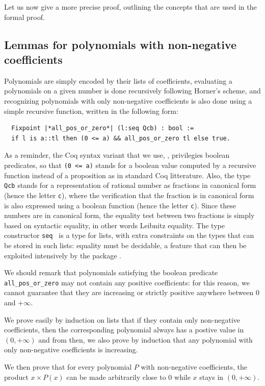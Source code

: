\documentclass{mscs}
\begin{document}
Let us now give a more precise proof, outlining the concepts that are
used in the formal proof.

\subsection{Lemmas for polynomials with non-negative coefficients}
Polynomials are simply encoded by their lists of coefficients, evaluating
a polynomials on a given number is done recursively following Horner's scheme,
and recognizing polynomials with only non-negative coefficients is also
done using a simple recursive function, written in the following form:
\begin{lstlisting}
  Fixpoint |*all_pos_or_zero*| (l:seq Qcb) : bool :=
  if l is a::tl then (0 <= a) && all_pos_or_zero tl else true.
\end{lstlisting}
As a reminder, the Coq syntax variant that we use, \ssr{},
privilegies boolean predicates, so that {\tt (0 <= a)} stands for a boolean
value computed by a recursive function instead of a proposition as in
standard Coq litterature.  Also, the type {\tt Qcb} stands for a
representation of
rational number as fractions in canonical form (hence the letter {\tt c}), where
the verification that the fraction is in canonical form is also expressed
using a boolean function (hence the letter {\tt c}).  Since these numbers
are in canonical form, the equality test between two fractions is simply based
on syntactic equality, in other words Leibnitz equality.  The type constructor
{\tt seq } is a type for lists, with extra constraints on the types
that can be
stored in such lists: equality must be decidable, a feature that can then be
exploited intensively by the \ssr{} package
\cite{GONTHIER:2008:INRIA-00258384:4}.

We should remark that polynomials satisfying the boolean predicate
{\tt all\_pos\_or\_zero} may not contain any positive coefficients: for this
reason, we cannot guarantee that they are increasing or strictly positive
anywhere between 0 and \(+\infty\).

We prove easily by induction on lists that if they contain only non-negative
coefficients, then the corresponding polynomial always has a postive value
in \((0,+\infty)\) and from then, we also prove by induction that
any polynomial with only non-negative coefficients is increasing.

We then prove that for every polynomial \(P\)  with non-negative coefficients,
the product \(x \times P(x)\) can be made arbitrarily close to 0 while
$x$ stays in \((0,+\infty)\).
\end{document}
